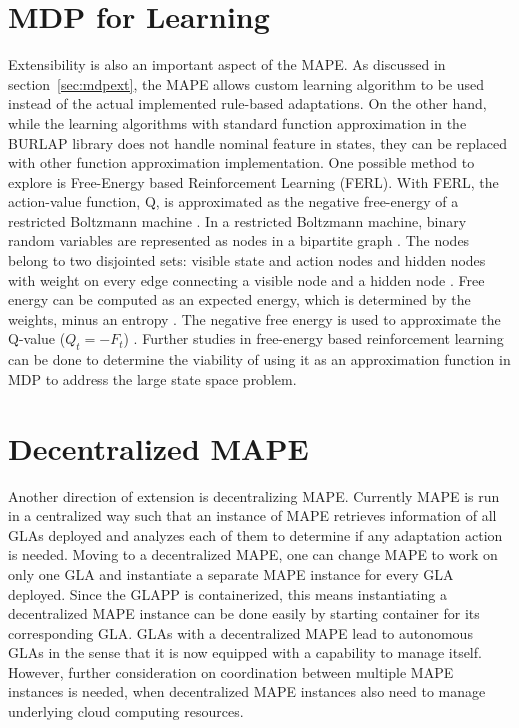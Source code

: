 \documentclass{seal_thesis}
\begin{document}
\section{MDP for Learning}
Extensibility is also an important aspect of the MAPE.
As discussed in section~\ref{sec:mdpext}, the MAPE allows custom learning algorithm to be used instead of the actual implemented rule-based adaptations.
On the other hand, while the learning algorithms with standard function approximation in the BURLAP library does not handle nominal feature in states, they can be replaced with other function approximation implementation.
One possible method to explore is Free-Energy based Reinforcement Learning (FERL).
With FERL, the action-value function, Q, is approximated as the negative free-energy of a restricted Boltzmann machine \cite{sallans2004reinforcement}.
In a restricted Boltzmann machine, binary random variables are represented as nodes in a bipartite graph \cite{sallans2004reinforcement}.
The nodes belong to two disjointed sets: visible state and action nodes and hidden nodes with weight on every edge connecting a visible node and a hidden node \cite{sallans2004reinforcement, 10.3389/fnbot.2013.00003}.
Free energy can be computed as an expected energy, which is determined by the weights, minus an entropy \cite{sallans2004reinforcement}.
The negative free energy is used to approximate the Q-value ($Q_t = -F_t$) \cite{sallans2004reinforcement, 10.3389/fnbot.2013.00003}.
Further studies in free-energy based reinforcement learning can be done to determine the viability of using it as an approximation function in MDP to address the large state space problem.


\section{Decentralized MAPE}
Another direction of extension is decentralizing MAPE.
Currently MAPE is run in a centralized way such that an instance of MAPE retrieves information of all GLAs deployed and analyzes each of them to determine if any adaptation action is needed.
Moving to a decentralized MAPE, one can change MAPE to work on only one GLA and instantiate a separate MAPE instance for every GLA deployed.
Since the GLAPP is containerized, this means instantiating a decentralized MAPE instance can be done easily by starting container for its corresponding GLA.
GLAs with a decentralized MAPE lead to autonomous GLAs in the sense that it is now equipped with a capability to manage itself.
However, further consideration on coordination between multiple MAPE instances is needed, when decentralized MAPE instances also need to manage underlying cloud computing resources.
\end{document}
